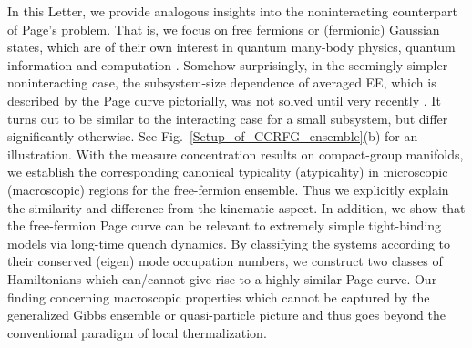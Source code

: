 \documentclass[twocolumn,english,prl,aps,superscriptaddress,amsmath,amssymb,floatfix]{revtex4-2}
\begin{document}

In this Letter, we provide analogous insights into
the noninteracting counterpart of Page's problem.  %
That is, we focus on free fermions or (fermionic) Gaussian states, which are of their own interest in quantum many-body physics, quantum information and computation \citep{matchgates,PhysRevA.65.032325,Bravyi2005,Wolf2006,Banuls2007,Fidkowski2010,PhysRevLett.116.030401,Shi2018,PhysRevLett.120.190501,PhysRevLett.121.200501,Circuit_complexity_free_fermion,fermionicTomograph1,Oszmaniec2022,Matos2022}. Somehow surprisingly, in the seemingly simpler noninteracting
case, the subsystem-size dependence of averaged EE,
which is described by the Page curve pictorially, was not solved until
very recently \citep{Bianchi2021,Bianchi2021a}. It turns out to be similar to the interacting case for a small subsystem, but differ significantly otherwise. See Fig.~\ref{Setup_of_CCRFG_ensemble}(b) for an illustration. With the measure concentration results on compact-group manifolds,  we establish the corresponding %
canonical typicality (atypicality) in microscopic (macroscopic) regions for the free-fermion ensemble. Thus we explicitly explain the similarity and difference from the kinematic aspect. In addition, we show that the free-fermion Page curve can be relevant to extremely simple tight-binding models via long-time quench dynamics. By classifying the systems according to their conserved (eigen) mode occupation numbers, we construct two classes of Hamiltonians which can/cannot give rise to a highly similar Page curve. Our finding concerning macroscopic properties which cannot be captured by the generalized Gibbs ensemble or quasi-particle picture and thus goes beyond the conventional paradigm of local thermalization. 
\end{document}
